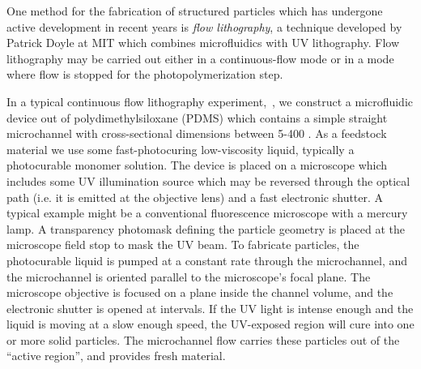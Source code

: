 One method for the fabrication of structured particles which has undergone active development in recent years is 
\textit{flow lithography}, a technique developed by Patrick Doyle at MIT which combines microfluidics with 
UV lithography.  Flow lithography may be carried out either in a continuous-flow mode or in a 
mode where flow is stopped for the photopolymerization step.



In a typical continuous flow lithography experiment,~\cite{dendukuri-cfl},
we construct a microfluidic device out of polydimethylsiloxane (PDMS)
which contains a simple straight microchannel with cross-sectional dimensions between 5-400 \microns. As a feedstock
material we use some fast-photocuring low-viscosity liquid, typically a photocurable monomer solution. The device is 
placed on a microscope which includes some UV illumination source which may be reversed through the optical path (i.e.
it is emitted at the objective lens) and a fast electronic shutter. A typical example might be a conventional 
fluorescence microscope with a mercury lamp.  A
transparency photomask defining the particle geometry is placed at the microscope
field stop to mask the UV beam.
To fabricate particles, the photocurable liquid is pumped 
at a constant rate through the microchannel, and the microchannel is oriented
parallel to the microscope's focal plane. The microscope objective is focused on a plane inside the channel
volume, and the
electronic shutter is opened at intervals. If the UV light is intense enough and the liquid is moving at a slow enough speed,
the UV-exposed region will cure into one or more solid particles.  
The microchannel flow carries these particles out of the ``active 
region'', and provides fresh material.


